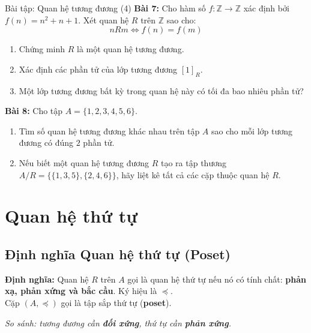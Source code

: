 \documentclass[12pt,a4paper]{article}
\begin{document}
\begin{baitap}{Bài tập: Quan hệ tương đương (4)}
\textbf{Bài 7:} Cho hàm số $f : \mathbb{Z} \to \mathbb{Z}$ xác định bởi $f(n) = n^2 + n + 1$. Xét quan hệ $R$ trên $\mathbb{Z}$ sao cho:
\[
  nRm \iff f(n) = f(m)
\]
\begin{enumerate}[label=\alph*)]
  \item Chứng minh $R$ là một quan hệ tương đương.
  \item Xác định các phần tử của lớp tương đương $[1]_R$.
  \item Một lớp tương đương bất kỳ trong quan hệ này có tối đa bao nhiêu phần tử?
\end{enumerate}

\textbf{Bài 8:} Cho tập $A = \{1, 2, 3, 4, 5, 6\}$.
\begin{enumerate}[label=\alph*)]
  \item Tìm số quan hệ tương đương khác nhau trên tập $A$ sao cho mỗi lớp tương đương có đúng $2$ phần tử.
  \item Nếu biết một quan hệ tương đương $R$ tạo ra tập thương $A/R = \{\{1, 3, 5\}, \{2, 4, 6\}\}$, hãy liệt kê tất cả các cặp thuộc quan hệ $R$.
\end{enumerate}
\end{baitap}

\section{Quan hệ thứ tự}

\subsection{Định nghĩa Quan hệ thứ tự (Poset)}

\textbf{\textcolor{AccentRed}{Định nghĩa:}} Quan hệ $R$ trên $A$ gọi là \textcolor{AccentRed}{quan hệ thứ tự} nếu nó có tính chất: \textbf{phản xạ, phản xứng và bắc cầu}. Ký hiệu là $\preceq$.\\
Cặp $(A, \preceq)$ gọi là tập sắp thứ tự (\textbf{poset}).

\textit{So sánh: tương đương cần \textbf{đối xứng}, thứ tự cần \textbf{phản xứng}.}
\end{document}
